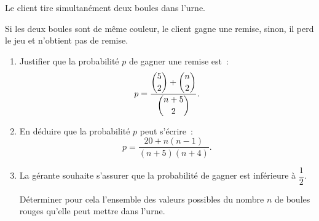 Le client tire simultanément deux boules dans l'urne.

Si les deux boules sont de même couleur, le client gagne une remise, sinon, il perd le jeu et n'obtient pas de remise.

\begin{enumerate}
\item Justifier que la probabilité $p$ de gagner une remise est~:
\[
p = \dfrac{\dbinom{5}{2} + \dbinom{n}{2}}{\dbinom{n+5}{2}}.
\]
\item En déduire que la probabilité $p$ peut s'écrire~:
\[
p = \dfrac{20 + n(n-1)}{(n+5)(n+4)}.
\]
\item La gérante souhaite s'assurer que la probabilité de gagner est inférieure à $\dfrac{1}{2}$.

Déterminer pour cela l'ensemble des valeurs possibles du nombre $n$ de boules rouges qu'elle peut mettre dans l'urne.
\end{enumerate}

\bigskip
